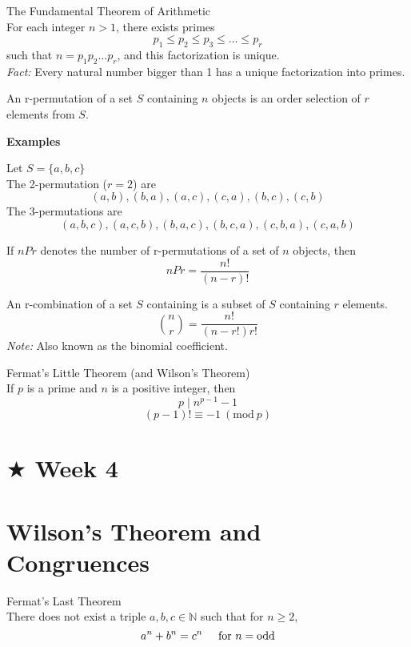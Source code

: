\documentclass{article}
\newcommand{\Mod}[1]{\ (\mathrm{mod}\ #1)}
\begin{document}
 The Fundamental Theorem of Arithmetic\\
For each integer \(n >1\), there exists primes
\[p_1 \leq p_2 \leq p_3 \leq \dots \leq p_r\]
such that \(n=p_1p_2\dots p_r\), and this factorization is unique.\\
\textit{Fact:} Every natural number bigger than 1 has a unique factorization into primes.

\vspace{0.5cm}
 An r-permutation of a set \(S\) containing \(n\) objects is an order selection of \(r\) elements from \(S\).

    \vspace{0.2cm}
    \centerline{\textbf{Examples}}
    \begin{adjustwidth}{40pt}{40pt}
    Let \(S=\{a,b,c\}\)\\
    The 2-permutation (\(r=2\)) are \[(a,b),(b,a),(a,c),(c,a),(b,c),(c,b)\]
    The 3-permutations are \[(a,b,c),(a,c,b),(b,a,c),(b,c,a),(c,b,a),(c,a,b)\]
    \end{adjustwidth}

\vspace{0.5cm}
 If \(nPr\) denotes the number of r-permutations of a set of \(n\) objects, then
\[nPr=\frac{n!}{(n-r)!}\]

\vspace{0.5cm}
 An r-combination of a set \(S\) containing is a subset of \(S\) containing \(r\) elements.
\[{{n}\choose{r}}=\frac{n!}{(n-r!)r!}\]
\textit{Note:} Also known as the binomial coefficient.

\vspace{0.5cm}
 Fermat's Little Theorem (and Wilson's Theorem)\\
If \(p\) is a prime and \(n\) is a positive integer, then
\[p \mid n^{p-1}-1\]
\[(p-1)! \equiv -1 \Mod{p} \]

\newpage
\section*{$\bigstar$ Week 4}
\section*{Wilson's Theorem and Congruences}

 Fermat's Last Theorem\\
There does not exist a triple \(a,b,c \in \mathbb{N}\) such that for \(n \geq 2\),
\[a^n+b^n=c^n \hspace{0.5cm} 
\text{for } n= \text{odd}\]
\end{document}
